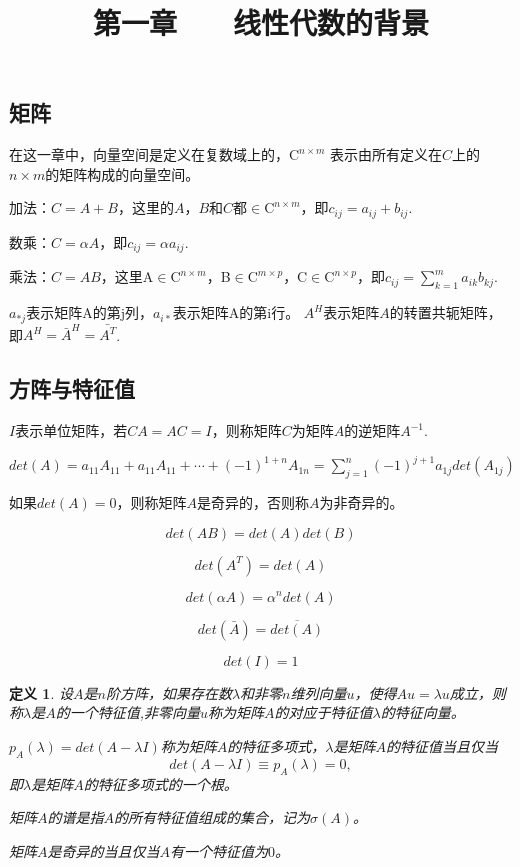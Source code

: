 \documentclass{article}
\begin{document}
\title{第一章$\qquad$线性代数的背景}
\maketitle  %
\section{}
\subsection{矩阵}
在这一章中，向量空间是定义在复数域上的，$\mathrm{C}^{n\times m}$ 表示由所有定义在$C$上的$n\times m$的矩阵构成的向量空间。

加法：$C=A+B$，这里的$A$，$B$和$C$都$\in\mathrm{C}^{n\times m}$，即$c_{ij}=a_{ij}+b_{ij}$.

数乘：$C=\alpha A$，即$c_{ij}=\alpha a_{ij}$.

乘法：$C=AB$，这里A$\in\mathrm{C}^{n\times m}$，B$\in\mathrm{C}^{m\times p}$，C$\in\mathrm{C}^{n\times p}$，即$c_{ij}=\sum_{k=1}^m a_{ik}b_{kj}$.

$a_{*j}$表示矩阵A的第j列，$a_{i*}$表示矩阵A的第i行。
$A^H$表示矩阵$A$的转置共轭矩阵，即$A^H=\bar{A}^H=\bar{A^T}$.
\subsection{方阵与特征值}






$I$表示单位矩阵，若$CA=AC=I$，则称矩阵$C$为矩阵$A$的逆矩阵$A^{-1}$.

$det(A)=a_{11}A_{11}+a_{11}A_{11}+\cdots+(-1)^{1+n}A_{1n}=\sum_{j=1}^n (-1)^{j+1} a_{1j}det(A_{1j}) $  

如果$det(A)=0$，则称矩阵$A$是奇异的，否则称$A$为非奇异的。

$$det(AB)=det(A)det(B)$$

$$det(A^T)=det(A)$$

$$det(\alpha A)=\alpha ^n det(A)$$

$$det(\bar{A})=\overline{det(A)}$$

$$det(I)=1$$

\newtheorem{definition}{定义}
\begin{definition}
设$A$是$n$阶方阵，如果存在数$\lambda$和非零$n$维列向量$u$，使得$Au=\lambda u$成立，则称$\lambda$是$A$的一个特征值,非零向量$u$称为矩阵$A$的对应于特征值$\lambda$的特征向量。

$p_A(\lambda)=det(A-\lambda I)$称为矩阵$A$的特征多项式，$\lambda $是矩阵$A$的特征值当且仅当
$$det(A-\lambda I)\equiv p_A(\lambda)=0,$$
即$\lambda$是矩阵$A$的特征多项式的一个根。

矩阵$A$的谱是指$A$的所有特征值组成的集合，记为$\sigma (A)$。

矩阵$A$是奇异的当且仅当$A$有一个特征值为$0$。
\end{definition}
\end{document}
